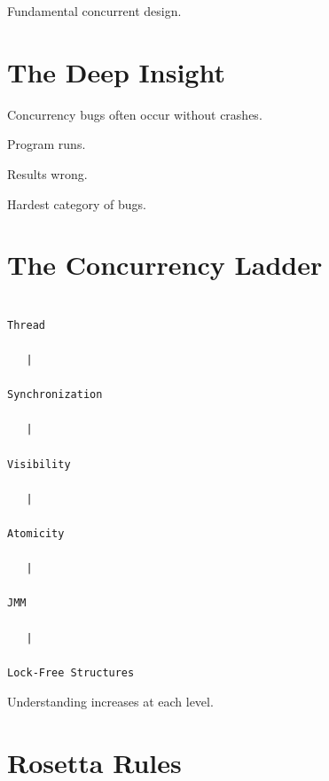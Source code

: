 \documentclass[11pt,a4paper]{book}
\begin{document}

Fundamental concurrent design.


\section{The Deep Insight}

Concurrency bugs often occur
without crashes.


Program runs.


Results wrong.


Hardest category of bugs.


\section{The Concurrency Ladder}

\begin{verbatim}

Thread

   |

Synchronization

   |

Visibility

   |

Atomicity

   |

JMM

   |

Lock-Free Structures

\end{verbatim}


Understanding increases
at each level.


\section{Rosetta Rules}
\end{document}
